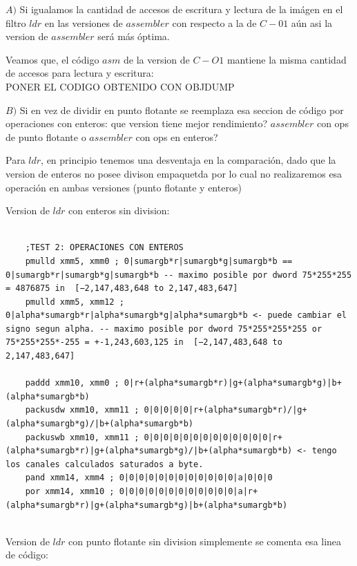 $A)$ Si igualamos la cantidad de accesos de escritura y lectura de la imágen en el filtro $ldr$ en las versiones de $assembler$ con respecto a la de $C-01$ aún asi la version de $assembler$ será más óptima.

Veamos que, el código $asm$ de la version de $C-O1$ mantiene la misma cantidad de accesos para lectura y escritura:\\

PONER EL CODIGO OBTENIDO CON OBJDUMP

$B)$ Si en vez de dividir en punto flotante se reemplaza esa seccion de código por operaciones con enteros: que version tiene mejor rendimiento? $assembler$ con ops de punto flotante o $assembler$ con ops en enteros?

Para $ldr$, en principio tenemos una desventaja en la comparación, dado que la version de enteros no posee divison empaquetda por lo cual no realizaremos esa operación en ambas versiones (punto flotante y enteros)

Version de $ldr$ con enteros sin division:\\

\begin{codesnippet}
\begin{verbatim}
                
	;TEST 2: OPERACIONES CON ENTEROS
	pmulld xmm5, xmm0 ; 0|sumargb*r|sumargb*g|sumargb*b == 0|sumargb*r|sumargb*g|sumargb*b -- maximo posible por dword 75*255*255 = 4876875 in  [−2,147,483,648 to 2,147,483,647]
	pmulld xmm5, xmm12 ; 0|alpha*sumargb*r|alpha*sumargb*g|alpha*sumargb*b <- puede cambiar el signo segun alpha. -- maximo posible por dword 75*255*255*255 or 75*255*255*-255 = +-1,243,603,125 in  [−2,147,483,648 to 2,147,483,647]

	paddd xmm10, xmm0 ; 0|r+(alpha*sumargb*r)|g+(alpha*sumargb*g)|b+(alpha*sumargb*b)
	packusdw xmm10, xmm11 ; 0|0|0|0|0|r+(alpha*sumargb*r)/|g+(alpha*sumargb*g)/|b+(alpha*sumargb*b)
	packuswb xmm10, xmm11 ; 0|0|0|0|0|0|0|0|0|0|0|0|0|r+(alpha*sumargb*r)|g+(alpha*sumargb*g)/|b+(alpha*sumargb*b) <- tengo los canales calculados saturados a byte.
	pand xmm14, xmm4 ; 0|0|0|0|0|0|0|0|0|0|0|0|a|0|0|0
	por xmm14, xmm10 ; 0|0|0|0|0|0|0|0|0|0|0|0|a|r+(alpha*sumargb*r)|g+(alpha*sumargb*g)|b+(alpha*sumargb*b)
                
\end{verbatim}
\end{codesnippet}

Version de $ldr$ con punto flotante sin division simplemente se comenta esa linea de código:\\

